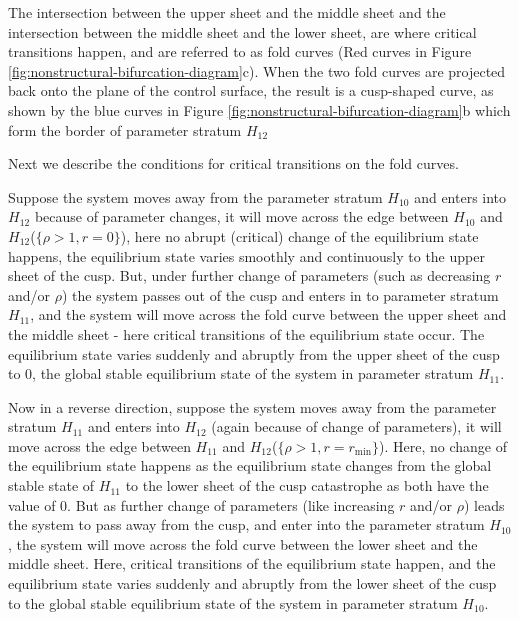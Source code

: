 \documentclass[a4paper,fleqn,12pt]{article}
\begin{document}
The intersection between the upper sheet and the middle sheet and the intersection between the middle sheet and the lower sheet, 
are where critical transitions happen,
and are referred to as fold curves (Red curves in Figure \ref{fig:nonstructural-bifurcation-diagram}c).
When the two fold curves are projected back onto the plane of the control surface, the result is a cusp-shaped curve,
as shown by the blue curves in Figure \ref{fig:nonstructural-bifurcation-diagram}b which form the border of parameter stratum $H_{12}$


Next we describe the conditions for critical transitions on the fold curves.

Suppose the system moves away from the parameter stratum $H_{10}$ and enters into $H_{12}$ because of parameter changes,
it will move across the edge between $H_{10}$ and $H_{12}$($\{\rho > 1, r = 0\}$),
here no abrupt (critical) change of the equilibrium state happens,
the equilibrium state varies smoothly and continuously to the upper sheet of the cusp.
But, under further change of parameters (such as decreasing $r$ and/or $\rho$) the system passes out of the cusp and enters in to parameter stratum $H_{11}$, and
the system will move across the fold curve between the upper sheet and the middle sheet - 
here critical transitions of the equilibrium state occur.
The equilibrium state varies suddenly and abruptly from the upper sheet of the cusp to 0, the global stable equilibrium state of the system in parameter stratum $H_{11}$.

Now in a reverse direction, suppose the system moves away from the parameter stratum $H_{11}$ and enters into $H_{12}$ (again because of change of parameters),
it will move across the edge between $H_{11}$ and $H_{12}$($\{\rho > 1, r = r_{\mathrm{min}}\}$). Here, no change of the equilibrium state happens as
the equilibrium state changes from the global stable state of $H_{11}$ to the lower sheet of the cusp catastrophe as both have the value of 0.
But as further change of parameters (like increasing $r$ and/or $\rho$) leads the system to pass away from the cusp, and enter into the parameter stratum $H_{10}$,
the system will move across the fold curve between the lower sheet and the middle sheet.
Here, critical transitions of the equilibrium state happen,
and the equilibrium state varies suddenly and abruptly from the lower sheet of the cusp to the global stable equilibrium state of the system in parameter stratum $H_{10}$.
\end{document}
